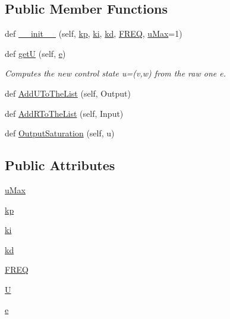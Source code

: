 \subsection*{Public Member Functions}
\begin{DoxyCompactItemize}
\item 
def \hyperlink{classcmd__TTB_1_1controllers_1_1turtlebotPID_a3360909164559c841e600896014a60b4}{\+\_\+\+\_\+init\+\_\+\+\_\+} (self, \hyperlink{classcmd__TTB_1_1controllers_1_1turtlebotPID_a46f9e76ece4ade360926bdc5250cdfc3}{kp}, \hyperlink{classcmd__TTB_1_1controllers_1_1turtlebotPID_aaf815b510701e946034699cf9039b961}{ki}, \hyperlink{classcmd__TTB_1_1controllers_1_1turtlebotPID_a33fb24bec3035fd064ce48c58420fde8}{kd}, \hyperlink{classcmd__TTB_1_1controllers_1_1turtlebotPID_ab20832f88555ed864be4e1f3f37ce2d7}{F\+R\+EQ}, \hyperlink{classcmd__TTB_1_1controllers_1_1turtlebotPID_a9eedbb29702ca64a002d8b13a79f515b}{u\+Max}=1)
\item 
def \hyperlink{classcmd__TTB_1_1controllers_1_1turtlebotPID_acfb641d74e87200c6a6832bfb22de252}{getU} (self, \hyperlink{classcmd__TTB_1_1controllers_1_1turtlebotPID_ac4c729835bb914598eefd16a3278ce14}{e})
\begin{DoxyCompactList}\small\item\em Computes the new control state u=(v,w) from the raw one e. \end{DoxyCompactList}\item 
def \hyperlink{classcmd__TTB_1_1controllers_1_1turtlebotPID_a9a16fe7aab46c6cbc8e31ee505d780d9}{Add\+U\+To\+The\+List} (self, Output)
\item 
def \hyperlink{classcmd__TTB_1_1controllers_1_1turtlebotPID_adf5ae9d1784ea20c14c626039b4e5136}{Add\+R\+To\+The\+List} (self, Input)
\item 
def \hyperlink{classcmd__TTB_1_1controllers_1_1turtlebotPID_aae3de1d737681be0f420a3ed8f2b63e8}{Output\+Saturation} (self, u)
\end{DoxyCompactItemize}
\subsection*{Public Attributes}
\begin{DoxyCompactItemize}
\item 
\hyperlink{classcmd__TTB_1_1controllers_1_1turtlebotPID_a9eedbb29702ca64a002d8b13a79f515b}{u\+Max}
\item 
\hyperlink{classcmd__TTB_1_1controllers_1_1turtlebotPID_a46f9e76ece4ade360926bdc5250cdfc3}{kp}
\item 
\hyperlink{classcmd__TTB_1_1controllers_1_1turtlebotPID_aaf815b510701e946034699cf9039b961}{ki}
\item 
\hyperlink{classcmd__TTB_1_1controllers_1_1turtlebotPID_a33fb24bec3035fd064ce48c58420fde8}{kd}
\item 
\hyperlink{classcmd__TTB_1_1controllers_1_1turtlebotPID_ab20832f88555ed864be4e1f3f37ce2d7}{F\+R\+EQ}
\item 
\hyperlink{classcmd__TTB_1_1controllers_1_1turtlebotPID_abc36f71fca7350bacae66d199d9cc18f}{U}
\item 
\hyperlink{classcmd__TTB_1_1controllers_1_1turtlebotPID_ac4c729835bb914598eefd16a3278ce14}{e}
\end{DoxyCompactItemize}


